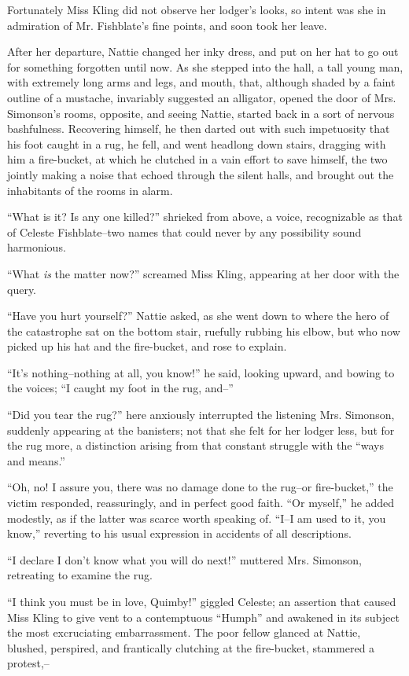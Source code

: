 Fortunately Miss Kling did not observe her lodger's looks, so intent was
she in admiration of Mr. Fishblate's fine points, and soon took her
leave.

After her departure, Nattie changed her inky dress, and put on her hat
to go out for something forgotten until now. As she stepped into the
hall, a tall young man, with extremely long arms and legs, and mouth,
that, although shaded by a faint outline of a mustache, invariably
suggested an alligator, opened the door of Mrs. Simonson's rooms,
opposite, and seeing Nattie, started back in a sort of nervous
bashfulness. Recovering himself, he then darted out with such
impetuosity that his foot caught in a rug, he fell, and went headlong
down stairs, dragging with him a fire-bucket, at which he clutched in a
vain effort to save himself, the two jointly making a noise that echoed
through the silent halls, and brought out the inhabitants of the rooms
in alarm.

``What is it? Is any one killed?'' shrieked from above, a voice,
recognizable as that of Celeste Fishblate--two names that could never by
any possibility sound harmonious.

``What \emph{is} the matter now?'' screamed Miss Kling, appearing at her door
with the query.

``Have you hurt yourself?'' Nattie asked, as she went down to where the
hero of the catastrophe sat on the bottom stair, ruefully rubbing his
elbow, but who now picked up his hat and the fire-bucket, and rose to
explain.

``It's nothing--nothing at all, you know!'' he said, looking upward, and
bowing to the voices; ``I caught my foot in the rug, and--''

``Did you tear the rug?'' here anxiously interrupted the listening Mrs.
Simonson, suddenly appearing at the banisters; not that she felt for her
lodger less, but for the rug more, a distinction arising from that
constant struggle with the ``ways and means.''

``Oh, no! I assure you, there was no damage done to the rug--or
fire-bucket,'' the victim responded, reassuringly, and in perfect good
faith. ``Or myself,'' he added modestly, as if the latter was scarce worth
speaking of. ``I--I am used to it, you know,'' reverting to his usual
expression in accidents of all descriptions.

``I declare I don't know what you will do next!'' muttered Mrs. Simonson,
retreating to examine the rug.

``I think you must be in love, Quimby!'' giggled Celeste; an assertion
that caused Miss Kling to give vent to a contemptuous ``Humph'' and
awakened in its subject the most excruciating embarrassment. The poor
fellow glanced at Nattie, blushed, perspired, and frantically clutching
at the fire-bucket, stammered a protest,--

